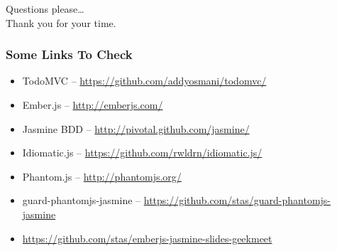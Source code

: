 \documentclass[compress]{beamer}
\begin{document}
\begin{frame}
  \begin{center}
  \huge Questions please\ldots
  \\
  Thank you for your time.
  \end{center}
\end{frame}

\begin{frame}
\frametitle{Some Links To Check}

\begin{itemize}
  \item TodoMVC -- \url{https://github.com/addyosmani/todomvc/}
  \item Ember.js -- \url{http://emberjs.com/}
  \item Jasmine BDD -- \url{http://pivotal.github.com/jasmine/}
  \item Idiomatic.js -- \url{https://github.com/rwldrn/idiomatic.js/}
  \item Phantom.js -- \url{http://phantomjs.org/}
  \item guard-phantomjs-jasmine -- \url{https://github.com/stas/guard-phantomjs-jasmine}
  \item \url{https://github.com/stas/emberjs-jasmine-slides-geekmeet}
\end{itemize}

\end{frame}
\end{document}
